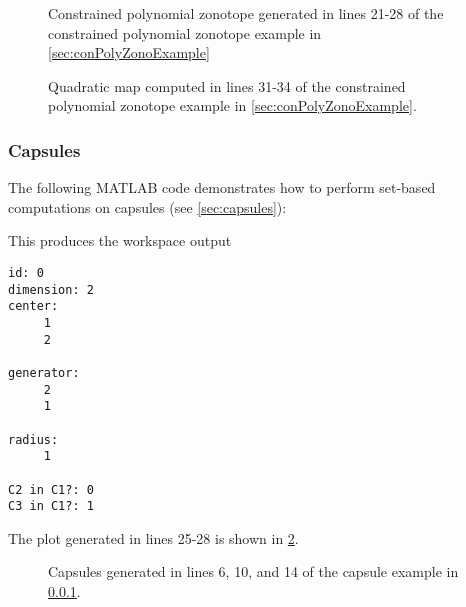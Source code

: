 \begin{figure}[h!tb]
\begin{minipage}{0.45\columnwidth}
  \centering
  \caption{Constrained polynomial zonotope generated in lines 21-28 of the constrained polynomial zonotope example in \cref{sec:conPolyZonoExample}}
  \label{fig:conPolyZonoExample1}
\end{minipage}
\hspace{0.08\columnwidth}
\begin{minipage}{0.45\columnwidth}
  \centering
  \caption{Quadratic map computed in lines 31-34 of the constrained polynomial zonotope example in \cref{sec:conPolyZonoExample}.}
  \label{fig:conPolyZonoExample2}
\end{minipage}
\end{figure}






\subsubsection{Capsules}	\label{sec:capsuleExample}

The following MATLAB code demonstrates how to perform set-based computations on capsules (see \cref{sec:capsules}):

{\small
}

This produces the workspace output
\begin{verbatim}
id: 0
dimension: 2
center: 
     1
     2

generator: 
     2
     1

radius: 
     1

C2 in C1?: 0
C3 in C1?: 1
\end{verbatim}

The plot generated in lines 25-28 is shown in \cref{fig:capsuleExample}.

\begin{figure}[h!tb]
  \centering
  \caption{Capsules generated in lines 6, 10, and 14 of the capsule example in \cref{sec:capsuleExample}.}
  \label{fig:capsuleExample}
\end{figure}




